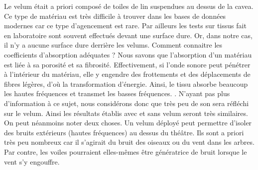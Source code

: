 Le \gls{velum} était a priori composé de toiles de lin \cite[p.38]{formige} suspendues au dessus de la \gls{cavea}. Ce type de matériau est très difficile à trouver dans les bases de données modernes car ce type d'agencement est rare. Par ailleurs les tests sur tissus fait en laboratoire sont souvent effectués devant une surface dure. Or, dans notre cas, il n'y a aucune surface dure derrière les \glspl{velum}. Comment connaitre les coefficients d'absorption adéquates ? Nous savons que l'absorption d'un matériau est liée à sa porosité et sa fibrosité. Effectivement, si l'onde sonore peut pénétrer à l'intérieur du matériau, elle y engendre des frottements et des déplacements de fibres légères, d'où la transformation d'énergie. Ainsi, le tissu absorbe beaucoup les hautes fréquences et transmet les basses fréquences. \cite[Matériaux]{acouphile}. N'ayant pas plus d'information à ce sujet, nous considérons donc que très peu de son sera réfléchi sur le \gls{velum}. Ainsi les résultats établis avec et sans \gls{velum} seront très similaires. On peut néanmoins noter deux choses. Un \gls{velum} déployé peut permettre d'isoler des bruits extérieurs (hautes fréquences) au dessus du théâtre. Ils sont a priori très peu nombreux car il s'agirait du bruit des oiseaux ou du vent dans les arbres. Par contre, les voiles pourraient elles-mêmes être génératrice de bruit lorsque le vent s'y engouffre.




\newpage

